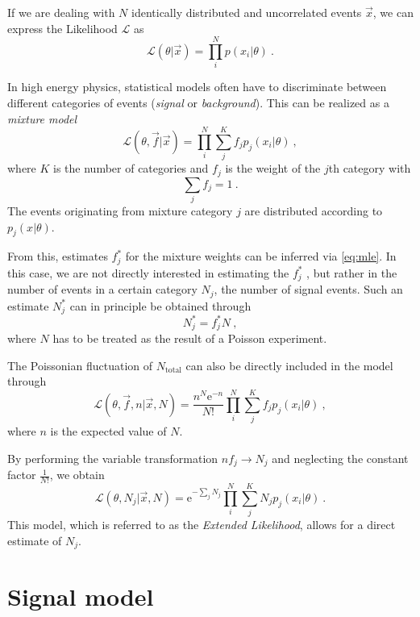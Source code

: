 If we are dealing with $N$ identically distributed and uncorrelated events $\vec{x}$, we can express the Likelihood $\mathcal{L}$ as
\begin{equation}
  \mathcal{L}(θ | \vec{x}) = \prod_i^N p(x_i | θ)\:.
\end{equation}

In high energy physics, statistical models often have to discriminate between different categories of events (\eg \textit{signal} or \textit{background}).
This can be realized as a \textit{mixture model} \begin{equation}
  \mathcal{L}(θ, \vec{f} | \vec{x}) = \prod_i^N \sum_j^K f_j p_j(x_i | θ)\:,
\end{equation}
where $K$ is the number of categories and $f_j$ is the weight of the $j$th category with
\begin{equation}
  \sum_j f_j = 1\:.
\end{equation}
The events originating from mixture category $j$ are distributed according to $p_j(x | θ)$.

From this, estimates $f_j^*$ for the mixture weights can be inferred via \eqref{eq:mle}.
In this case, we are not directly interested in estimating the $f_j^*$ , but rather in the number of events in a certain category $N_j$, \eg the number of signal events.
Such an estimate $N^*_j$ can in principle be obtained through
\begin{equation}
  N^*_j = f^*_j N\:,
\end{equation}
where $N$ has to be treated as the result of a Poisson experiment.

The Poissonian fluctuation of $N_\text{total}$ can also be directly included in the model through
\begin{equation}
  \mathcal{L}(θ, \vec{f}, n | \vec{x}, N) = \frac{n^N\mathrm{e}^{-n}}{N!}  \prod_i^N \sum_j^K f_j p_j(x_i | θ)\:,
\end{equation}
where $n$ is the expected value of $N$.

By performing the variable transformation $n f_j \to N_j$ and neglecting the constant factor $\frac{1}{N!}$, we obtain
\begin{equation}
  \mathcal{L}(θ, N_j | \vec{x}, N) = \mathrm{e}^{-\sum_j N_j}  \prod_i^N \sum_j^K N_j p_j(x_i | θ)\:.
\end{equation}
This model, which is referred to as the \textit{Extended Likelihood}\cite{Lyons1986}, allows for a direct estimate of $N_j$.

\section{Signal model}
\label{signalmodel}


